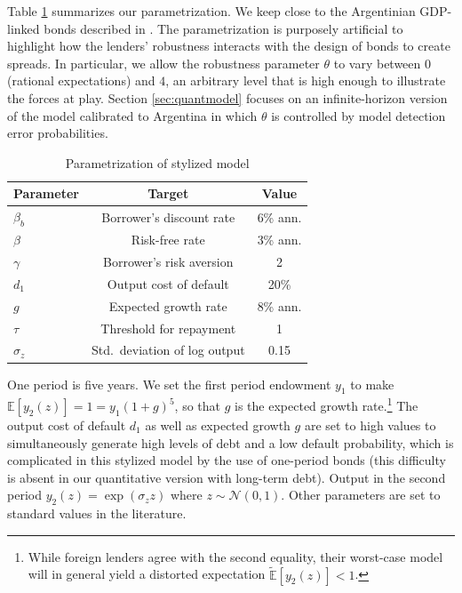 Table \ref{Table_2per_parameters} summarizes our parametrization. We keep close to the Argentinian GDP-linked bonds described in \citet*{ChamonCostaRicci2008}. The parametrization is purposely artificial to highlight how the lenders' robustness interacts with the design of bonds to create spreads. 
In particular, we allow the robustness parameter $\theta$ to vary between $0$ (rational expectations) and $4$, an arbitrary level that is high enough to illustrate the forces at play. Section \ref{sec:quantmodel} focuses on an infinite-horizon version of the model calibrated to Argentina in which $\theta$ is controlled by model detection error probabilities.
\begin{table}[!hbtp]\centering \small
  \caption{Parametrization of stylized model}\label{Table_2per_parameters}
  \begin{tabular}{@{}lcc@{}} \toprule
    \textbf{Parameter} & \textbf{Target} & \textbf{Value} \\ \midrule
    $\beta_b$       & Borrower's discount rate & 6\% ann. \\
    $\beta$         & Risk-free rate & 3\% ann.        \\
    $\gamma$        & Borrower's risk aversion & 2     \\
    $d_1$        & Output cost of default & 20\%    \\
    $g$             & Expected growth rate& 8\% ann.   \\ 
    $\tau$          & Threshold for repayment & 1   \\
    $\sigma_z$      & Std.~deviation of log output & 0.15 \\
    \bottomrule
  \end{tabular}
\end{table}

One period is five years. We set the first period endowment $y_1$ to make $\mathbb{E}[y_2(z)] = 1 = y_1 (1+g)^5$, so that $g$ is the expected growth rate.\footnote{While foreign lenders agree with the second equality, their worst-case model will in general yield a distorted expectation $\tilde{\mathbb{E}}[y_2(z)] < 1$.} The output cost of default $d_1$ as well as expected growth $g$ are set to high values to simultaneously generate high levels of debt and a low default probability, which is complicated in this stylized model by the use of one-period bonds (this difficulty is absent in our quantitative version with long-term debt). Output in the second period $y_2(z) = \exp(\sigma_z z)$ where $z \sim \mathcal{N}(0,1)$. Other parameters are set to standard values in the literature.

